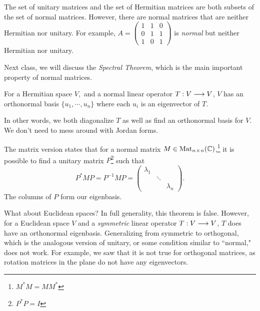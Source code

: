 The set of unitary matrices and the set of Hermitian matrices are both subsets of the set of normal matrices. However, there are normal matrices that are neither Hermitian nor unitary. For example, $A = \begin{pmatrix}1 & 1 & 0 \\ 0 & 1 & 1 \\ 1 & 0 & 1 \end{pmatrix}$ is \emph{normal} but neither Hermitian nor unitary. 

Next class, we will discuss the \emph{Spectral Theorem}, which is the main important property of normal matrices.
\begin{theorem}
For a Hermitian space $V,$ and a normal linear operator $T: V \longrightarrow V$, $V$ has an orthonormal basis $\{u_1, \cdots, u_n\}$ where each $u_i$ is an eigenvector of $T.$
\end{theorem}
In other words, we both diagonalize $T$ as well as find an orthonormal basis for $V$. 
We don't need to mess around with Jordan forms. 

The matrix version states that for a normal matrix $M \in \text{Mat}_{n \hspace{0.05em}{\times}\hspace{0.05em} n}(\mathbb C)$,\footnote{$M^*M = MM^*$} it is possible to find a unitary matrix $P$\footnote{$P^*P = I$} such that \[P^*MP = P^{-1}MP = \begin{pmatrix} \lambda_1 & & \\
& \ddots & \\ & & \lambda_n\end{pmatrix}.\] The columns of $P$ form our eigenbasis. 

What about Euclidean spaces? In full generality, this theorem is false. However, for a Euclidean space $V$ and a \emph{symmetric} linear operator $T: V \longrightarrow V$, $T$ does have an orthonormal eigenbasis. Generalizing from symmetric to orthogonal, which is the analogous version of unitary, or some condition similar to ``normal," does not work. For example, we saw that it is not true for orthogonal matrices, as rotation matrices in the plane do not have any eigenvectors. 

\newpage